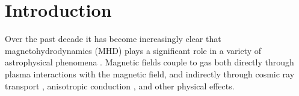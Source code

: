 \section{Introduction}
\label{sec:intro}


Over the past decade it has become increasingly clear that magnetohydrodynamics (MHD) plays a significant role in a variety of astrophysical phenomena \citep[e.g.][]{shin_2008, beck_2016, banda_2016, naab_2017, han_2017, ntormousi_dynamo_2020, wibking_2021, gent_2021}. Magnetic fields couple to gas both directly through plasma interactions with the magnetic field, and indirectly through cosmic ray transport \citep[e.g.][]{pfrommer_simulating_2017, girichidis_spectrally_2019, chan_cosmic_2019, buck_effects_2020, werhahn_cosmic_2021, yoshida_trajectory_2021, girichidis_spectrally_2022, nunez-castineyra_cosmic-ray_2022, werhahn_gamma-ray_2023}, anisotropic conduction \citep[e.g.][]{yang_fermi_2012, hanasz_cosmic_2013, simpson_role_2016, girichidis_launching_2016, pakmor_galactic_2016, bruggen_2023}, and other physical effects.



